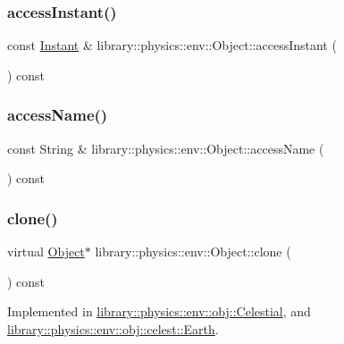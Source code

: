 \subsubsection{\texorpdfstring{access\+Instant()}{accessInstant()}}
{\footnotesize\ttfamily const \hyperlink{classlibrary_1_1physics_1_1time_1_1_instant}{Instant} \& library\+::physics\+::env\+::\+Object\+::access\+Instant (\begin{DoxyParamCaption}{ }\end{DoxyParamCaption}) const}

\mbox{\label{classlibrary_1_1physics_1_1env_1_1_object_a0cf28bef038e493ee0771680976f5e28}} 
\subsubsection{\texorpdfstring{access\+Name()}{accessName()}}
{\footnotesize\ttfamily const String \& library\+::physics\+::env\+::\+Object\+::access\+Name (\begin{DoxyParamCaption}{ }\end{DoxyParamCaption}) const}

\mbox{\label{classlibrary_1_1physics_1_1env_1_1_object_a498e0d1a15e937a5aa77374c6f899768}} 
\subsubsection{\texorpdfstring{clone()}{clone()}}
{\footnotesize\ttfamily virtual \hyperlink{classlibrary_1_1physics_1_1env_1_1_object}{Object}$\ast$ library\+::physics\+::env\+::\+Object\+::clone (\begin{DoxyParamCaption}{ }\end{DoxyParamCaption}) const\hspace{0.3cm}{\ttfamily [pure virtual]}}



Implemented in \hyperlink{classlibrary_1_1physics_1_1env_1_1obj_1_1_celestial_aaf8aa41a0ff9336eba62c07e3c27f82d}{library\+::physics\+::env\+::obj\+::\+Celestial}, and \hyperlink{classlibrary_1_1physics_1_1env_1_1obj_1_1celest_1_1_earth_aca39bec00a2046a3fcef9bf22be52428}{library\+::physics\+::env\+::obj\+::celest\+::\+Earth}.

